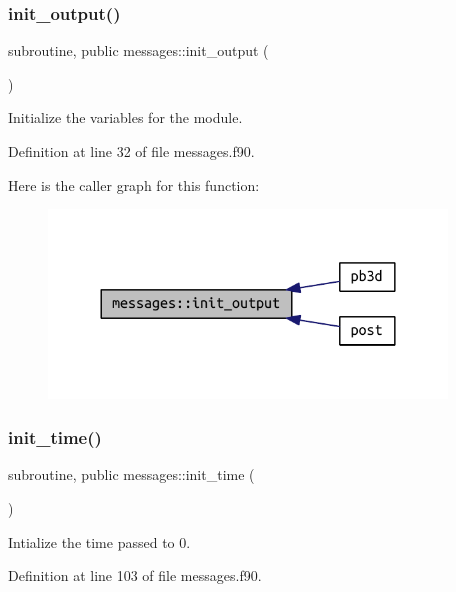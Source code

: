 \subsubsection{\texorpdfstring{init\+\_\+output()}{init\_output()}}
{\footnotesize\ttfamily subroutine, public messages\+::init\+\_\+output (\begin{DoxyParamCaption}{ }\end{DoxyParamCaption})}



Initialize the variables for the module. 



Definition at line 32 of file messages.\+f90.

Here is the caller graph for this function\+:\nopagebreak
\begin{figure}[H]
\begin{center}
\leavevmode
\includegraphics[width=300pt]{namespacemessages_a5e45296f088e9f31115a3b8d869f3177_icgraph}
\end{center}
\end{figure}
\mbox{\label{namespacemessages_a8ed785522aec7ac549263cdd54a8619a}} 
\subsubsection{\texorpdfstring{init\+\_\+time()}{init\_time()}}
{\footnotesize\ttfamily subroutine, public messages\+::init\+\_\+time (\begin{DoxyParamCaption}{ }\end{DoxyParamCaption})}



Intialize the time passed to 0. 



Definition at line 103 of file messages.\+f90.

